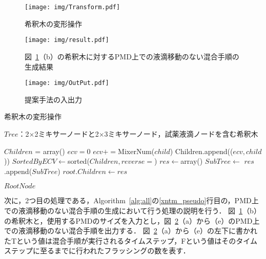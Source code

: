 \begin{figure}[tbp]
 \centering\texttt{[image: img/Transform.pdf]}
 \caption{希釈木の変形操作}\label{fig:Transform}
\end{figure}

\begin{figure}[tbp]
 \centering\texttt{[image: img/result.pdf]}
    \caption{図~\ref{fig:Transform}（b）の希釈木に対するPMD上での液滴移動のない混合手順の生成結果}\label{fig:result}
\end{figure}

\begin{figure}[tbp]
 \centering\texttt{[image: img/OutPut.pdf]}
 \caption{提案手法の入出力}\label{fig:inputoutput}
\end{figure}

\begin{algorithm}[tbp]
 \caption{希釈木の変形操作}\label{alg:transform}
 \begin{algorithmic}[1]
     \Require $\mathit{Tree}$：2$\times$2ミキサーノードと2$\times$3ミキサーノード，試薬液滴ノードを含む希釈木 

        \State $\mathit{Children}$ = array()
            \State $\mathit{ecv}=0$
                \State $\mathit{ecv}+=$MixerNum($child$) 
            \EndIf 
            \State Children.append(($\mathit{ecv,child}$))
        \EndFor 
        \State $\mathit{SortedByECV} \gets $sorted($Children,reverse=$\True)
        \State $\mathit{res}\gets$array()
            \State $\mathit{SubTree}\gets $
            \State $\mathit{res}$.append($\mathit{SubTree}$)
        \EndFor 
        \State $\mathit{root.Children}\gets \mathit{res}$ 

        \Return $\mathit{RootNode}$
    \EndFunction 

 \end{algorithmic}
\end{algorithm}
次に，2つ目の処理である，Algorithm~\ref{alg:all}の\ref{xntm_pseudo}行目の，PMD上での液滴移動のない混合手順の生成において行う処理の説明を行う．
図~\ref{fig:Transform}（b）の希釈木と，使用するPMDのサイズを入力とし，図~\ref{fig:result}（a）から（e）のPMD上での液滴移動のない混合手順を出力する．
図~\ref{fig:result}（a）から（e）の左下に書かれたTという値は混合手順が実行されるタイムステップ，Fという値はそのタイムステップに至るまでに行われたフラッシングの数を表す．

